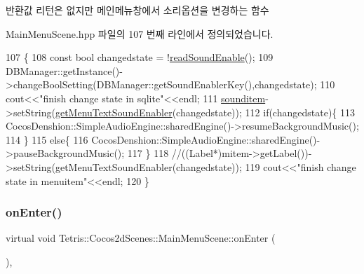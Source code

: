 \begin{DoxyReturn}{반환값}
리턴은 없지만 메인메뉴창에서 소리옵션을 변경하는 함수 
\end{DoxyReturn}


Main\+Menu\+Scene.\+hpp 파일의 107 번째 라인에서 정의되었습니다.


\begin{DoxyCode}
107                                                      \{
108         \textcolor{keyword}{const} \textcolor{keywordtype}{bool} changedstate = !\hyperlink{class_tetris_1_1_cocos2d_scenes_1_1_main_menu_scene_a0454c0398dc84b0c8f9e1b3ff72da69d}{readSoundEnable}();
109         DBManager::getInstance()->changeBoolSetting(DBManager::getSoundEnablerKey(),changedstate);
110         cout<<\textcolor{stringliteral}{"finish change state in sqlite"}<<endl;
111          \hyperlink{class_tetris_1_1_cocos2d_scenes_1_1_main_menu_scene_a39d5adca64f40a97548344531ff019b8}{sounditem}->setString(\hyperlink{class_tetris_1_1_cocos2d_scenes_1_1_main_menu_scene_a0c0e61e744b15a2e2c55ad37be625c2f}{getMenuTextSoundEnabler}(changedstate));
112         \textcolor{keywordflow}{if}(changedstate)\{
113             CocosDenshion::SimpleAudioEngine::sharedEngine()->resumeBackgroundMusic();
114         \}
115         \textcolor{keywordflow}{else}\{
116             CocosDenshion::SimpleAudioEngine::sharedEngine()->pauseBackgroundMusic();
117         \}
118         \textcolor{comment}{//((Label*)mitem->getLabel())->setString(getMenuTextSoundEnabler(changedstate));}
119         cout<<\textcolor{stringliteral}{"finish change state in menuitem"}<<endl;
120     \}
\end{DoxyCode}
\mbox{\label{class_tetris_1_1_cocos2d_scenes_1_1_main_menu_scene_a63cfd0adc032b868536a89b103c44fc5}} 
\subsubsection{\texorpdfstring{on\+Enter()}{onEnter()}}
{\footnotesize\ttfamily virtual void Tetris\+::\+Cocos2d\+Scenes\+::\+Main\+Menu\+Scene\+::on\+Enter (\begin{DoxyParamCaption}{ }\end{DoxyParamCaption})\hspace{0.3cm}{\ttfamily [inline]}, {\ttfamily [virtual]}}




